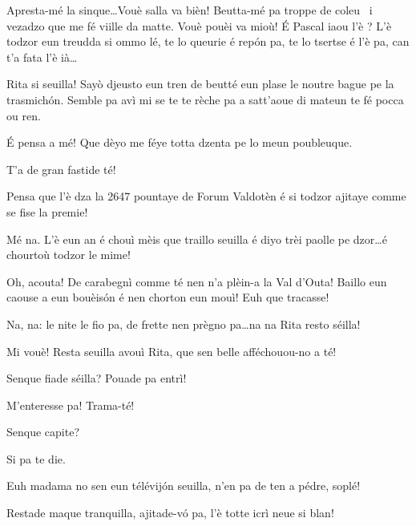 \begin{drama}
\Ritaspeaks {} Apresta-mé la sinque\ldots Vouè salla va bièn!  Beutta-mé pa troppe de coleu \trucco\ i vezadzo que me fé viille da matte. Vouè pouèi va mioù! É Pascal iaou l’è ? L’è todzor eun treudda si ommo lé, te lo queurie é repón pa, te lo tsertse é l’è pa, can t’a fata l’è ià\ldots

\Pascalspeaks Rita si seuilla! Sayò djeusto eun tren de beutté eun plase le noutre bague pe la trasmichón. Semble pa avì mi se te te rèche pa a satt'aoue di mateun te fé pocca ou ren.

\Ritaspeaks É pensa a mé! Que dèyo me féye totta dzenta pe lo meun poubleuque.

\Pascalspeaks T’a de gran fastide té!

\Ritaspeaks Pensa que l’è dza la 2647 pountaye de Forum Valdotèn é si todzor ajitaye comme se fise la premie!

\Pascalspeaks Mé na. L’è eun an é chouì mèis que traillo seuilla é diyo trèi paolle pe dzor\ldots é chourtoù todzor le mime!

\Ritaspeaks Oh, acouta! De carabegnì comme té nen n'a plèin-a la Val d’Outa! Baillo eun caouse a eun bouèis\'on é nen chorton eun mouì! Euh que tracasse!

\Pascalspeaks Na, na: le nite le fio pa, de frette nen prègno pa\ldots na na Rita resto séilla!

\Ritaspeaks Mi vouè!  Resta seuilla avouì Rita, que sen belle afféchouou-no a té!


\Pascalspeaks Senque fiade séilla? Pouade pa entrì!

\Eumprezeospeaks M’enteresse pa! Trama-té!

\Ritaspeaks Senque capite? 


\Pascalspeaks Si pa te die.

\Ritaspeaks {} Euh madama no sen eun télévijón seuilla, n'en pa de ten a pédre, soplé!

\Eumprezeospeaks Restade maque tranquilla, ajitade-v\'o pa, l’è tot\-te icrì neue si blan!



\end{drama}
